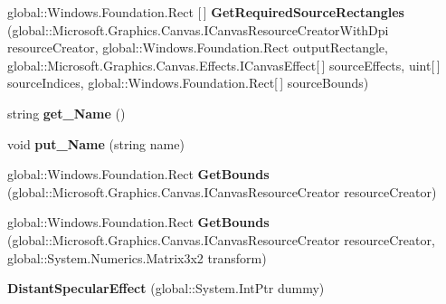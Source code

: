 \begin{DoxyCompactItemize}
global\+::\+Windows.\+Foundation.\+Rect \mbox{[}$\,$\mbox{]} {\bfseries Get\+Required\+Source\+Rectangles} (global\+::\+Microsoft.\+Graphics.\+Canvas.\+I\+Canvas\+Resource\+Creator\+With\+Dpi resource\+Creator, global\+::\+Windows.\+Foundation.\+Rect output\+Rectangle, global\+::\+Microsoft.\+Graphics.\+Canvas.\+Effects.\+I\+Canvas\+Effect\mbox{[}$\,$\mbox{]} source\+Effects, uint\mbox{[}$\,$\mbox{]} source\+Indices, global\+::\+Windows.\+Foundation.\+Rect\mbox{[}$\,$\mbox{]} source\+Bounds)
\item 
\mbox{\label{class_microsoft_1_1_graphics_1_1_canvas_1_1_effects_1_1_distant_specular_effect_a82e8aaa30963376f6b07df9e21242c69}} 
string {\bfseries get\+\_\+\+Name} ()
\item 
\mbox{\label{class_microsoft_1_1_graphics_1_1_canvas_1_1_effects_1_1_distant_specular_effect_a28aa135298de7a35d3863337b9b75fdf}} 
void {\bfseries put\+\_\+\+Name} (string name)
\item 
\mbox{\label{class_microsoft_1_1_graphics_1_1_canvas_1_1_effects_1_1_distant_specular_effect_a9b4792ba0a0d27c7fa752d4020ded41a}} 
global\+::\+Windows.\+Foundation.\+Rect {\bfseries Get\+Bounds} (global\+::\+Microsoft.\+Graphics.\+Canvas.\+I\+Canvas\+Resource\+Creator resource\+Creator)
\item 
\mbox{\label{class_microsoft_1_1_graphics_1_1_canvas_1_1_effects_1_1_distant_specular_effect_a1767db5f8057f907e45b60d25f75e9dc}} 
global\+::\+Windows.\+Foundation.\+Rect {\bfseries Get\+Bounds} (global\+::\+Microsoft.\+Graphics.\+Canvas.\+I\+Canvas\+Resource\+Creator resource\+Creator, global\+::\+System.\+Numerics.\+Matrix3x2 transform)
\item 
\mbox{\label{class_microsoft_1_1_graphics_1_1_canvas_1_1_effects_1_1_distant_specular_effect_aa2fbc147e71a970a34acd9561a293e56}} 
{\bfseries Distant\+Specular\+Effect} (global\+::\+System.\+Int\+Ptr dummy)
\item 
\mbox{\label{class_microsoft_1_1_graphics_1_1_canvas_1_1_effects_1_1_distant_specular_effect_ac11d721e79988e45b94991e5cdc3d657}} 

\end{DoxyCompactItemize}
